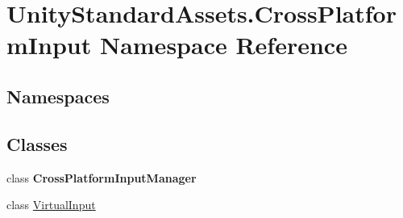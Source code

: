 \hypertarget{namespace_unity_standard_assets_1_1_cross_platform_input}{}\section{Unity\+Standard\+Assets.\+Cross\+Platform\+Input Namespace Reference}
\label{namespace_unity_standard_assets_1_1_cross_platform_input}
\subsection*{Namespaces}
\begin{DoxyCompactItemize}
\end{DoxyCompactItemize}
\subsection*{Classes}
\begin{DoxyCompactItemize}
\item 
class {\bfseries Cross\+Platform\+Input\+Manager}
\item 
class \hyperlink{class_unity_standard_assets_1_1_cross_platform_input_1_1_virtual_input}{Virtual\+Input}
\end{DoxyCompactItemize}
